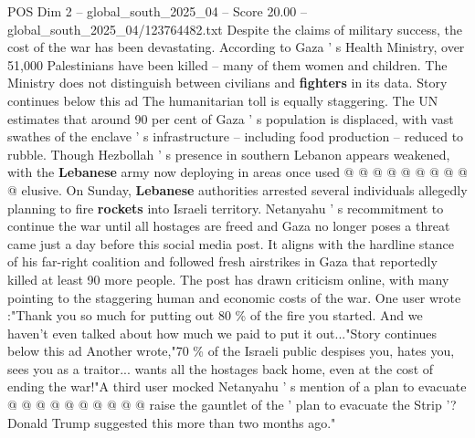 \begin{textsample}{POS Dim 2 – global\_south\_2025\_04 – Score 20.00 – global\_south\_2025\_04/123764482.txt}
Despite the claims of military success, the cost of the war has been devastating.
According to Gaza ' s Health Ministry, over 51,000 Palestinians have been killed -- many of them women and children.
The Ministry does not distinguish between civilians and \textbf{fighters} in its data.
Story continues below this ad The humanitarian toll is equally staggering.
The UN estimates that around 90 per cent of Gaza ' s population is displaced, with vast swathes of the enclave ' s infrastructure -- including food production -- reduced to rubble.
Though Hezbollah ' s presence in southern Lebanon appears weakened, with the \textbf{Lebanese} army now deploying in areas once used @ @ @ @ @ @ @ @ @ @ elusive.
On Sunday, \textbf{Lebanese} authorities arrested several individuals allegedly planning to fire \textbf{rockets} into Israeli territory.
Netanyahu ' s recommitment to continue the war until all hostages are freed and Gaza no longer poses a threat came just a day before this social media post.
It aligns with the hardline stance of his far-right coalition and followed fresh airstrikes in Gaza that reportedly killed at least 90 more people.
The post has drawn criticism online, with many pointing to the staggering human and economic costs of the war.
One user wrote :"Thank you so much for putting out 80 \% of the fire you started.
And we haven't even talked about how much we paid to put it out..."Story continues below this ad Another wrote,"70 \% of the Israeli public despises you, hates you, sees you as a traitor... wants all the hostages back home, even at the cost of ending the war!"A third user mocked Netanyahu ' s mention of a plan to evacuate @ @ @ @ @ @ @ @ @ @ raise the gauntlet of the ' plan to evacuate the Strip '?
Donald Trump suggested this more than two months ago."

\end{textsample}
